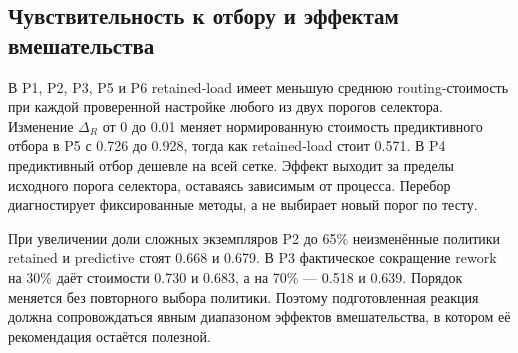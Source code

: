 \subsection{Чувствительность к отбору и эффектам вмешательства}
В P1, P2, P3, P5 и P6 retained-load имеет меньшую среднюю routing-стоимость при каждой проверенной настройке любого из двух порогов селектора. Изменение $\Delta_R$ от 0 до 0.01 меняет нормированную стоимость предиктивного отбора в P5 с 0.726 до 0.928, тогда как retained-load стоит 0.571. В P4 предиктивный отбор дешевле на всей сетке. Эффект выходит за пределы исходного порога селектора, оставаясь зависимым от процесса. Перебор диагностирует фиксированные методы, а не выбирает новый порог по тесту.

При увеличении доли сложных экземпляров P2 до 65\% неизменённые политики retained и predictive стоят 0.668 и 0.679. В P3 фактическое сокращение rework на 30\% даёт стоимости 0.730 и 0.683, а на 70\% — 0.518 и 0.639. Порядок меняется без повторного выбора политики. Поэтому подготовленная реакция должна сопровождаться явным диапазоном эффектов вмешательства, в котором её рекомендация остаётся полезной.
